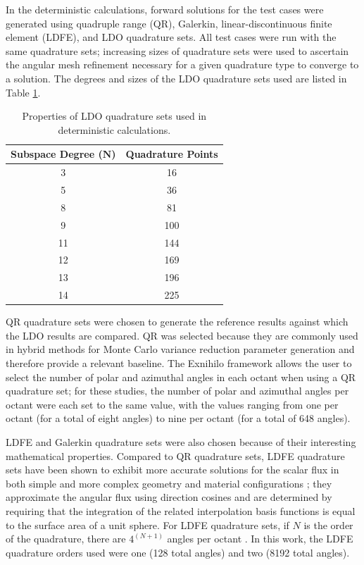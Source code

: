 \documentclass{article} %
\begin{document}
In the deterministic calculations, forward solutions for the test cases were
generated using quadruple range (QR), Galerkin, linear-discontinuous finite 
element (LDFE), and LDO quadrature sets. All test cases were run with the same 
quadrature sets; increasing sizes of quadrature sets were used to ascertain the
angular mesh refinement necessary for a given quadrature type to converge to a 
solution. The degrees and sizes of the LDO quadrature sets used are listed in
Table \ref{ldo-n}.

\begin{table}[!htb]
\centering
\caption{Properties of LDO quadrature sets used in deterministic calculations.}
\begin{tabular}{cc}
\multicolumn{1}{l}{\textbf{Subspace Degree ($\mathbf{N}$)}} & 
\multicolumn{1}{l}{\textbf{Quadrature Points}} \\
\hline
3 & 16 \\
5 & 36 \\
8 & 81 \\
9 & 100 \\
11 & 144 \\
12 & 169 \\
13 & 196 \\
14 & 225 \\
\end{tabular}
\label{ldo-n}
\end{table}

QR quadrature sets were chosen to generate the reference results against which
the LDO results are compared. QR was selected because they are commonly used 
in hybrid methods for Monte Carlo variance reduction parameter generation and 
therefore provide a relevant baseline. The Exnihilo framework allows the user
to select the number of polar and azimuthal angles in each octant when using a
QR quadrature set; for these studies, the number of polar and azimuthal angles
per octant were each set to the same value, with the values ranging from one
per octant (for a total of eight angles) to nine per octant (for a total of
648 angles). 

LDFE and Galerkin quadrature sets were also chosen because of their interesting
mathematical properties. Compared to QR quadrature sets, LDFE quadrature sets
have been shown to exhibit more accurate solutions for the scalar flux in both 
simple and more complex geometry and material configurations \cite{ldfe}; they 
approximate the angular flux using direction cosines and are determined by
requiring that the integration of the related interpolation basis functions is
equal to the surface area of a unit sphere. For LDFE quadrature sets, if $N$ is
the order of the quadrature, there are $4^{(N+1)}$ angles per octant
\cite{exum}. In this work, the LDFE quadrature orders used were one (128 total
angles) and two (8192 total angles).
\end{document}
